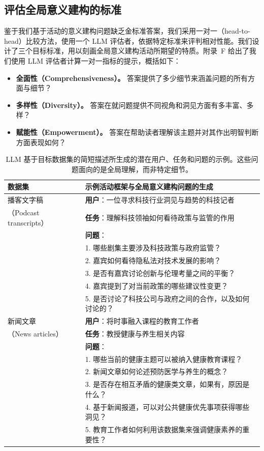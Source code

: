 \documentclass[11pt,UTF8,fontset=fandol]{ctexart}
\begin{document}
\subsection{评估全局意义建构的标准}

鉴于我们基于活动的意义建构问题缺乏金标准答案，我们采用一对一（head-to-head）比较方法，使用一个 LLM 评估者，依据特定标准来评判相对性能。我们设计了三个目标标准，用以刻画全局意义建构活动所期望的特质。附录~F 给出了我们使用 LLM 评估者计算一对一指标的提示，概括如下：

\begin{itemize}[leftmargin=2em]
\item \textbf{全面性（Comprehensiveness）。} 答案提供了多少细节来涵盖问题的所有方面与细节？
\item \textbf{多样性（Diversity）。} 答案在就问题提供不同视角和洞见方面有多丰富、多样？
\item \textbf{赋能性（Empowerment）。} 答案在帮助读者理解该主题并对其作出明智判断方面表现如何？
\end{itemize}

\begin{table}[H]\centering
\caption{LLM 基于目标数据集的简短描述所生成的潜在用户、任务和问题的示例。这些问题面向的是全局理解，而非特定细节。}
\label{tab:1}
\small
\renewcommand{\arraystretch}{1.25}
\begin{tabular}{@{}p{2.2cm}p{12.5cm}@{}}
\toprule
\textbf{数据集} & \textbf{示例活动框架与全局意义建构问题的生成} \\
\midrule
播客文字稿 & \textbf{用户}：一位寻求科技行业洞见与趋势的科技记者 \\
（Podcast transcripts） & \textbf{任务}：理解科技领袖如何看待政策与监管的作用 \\
 & \textbf{问题}： \\
 & 1. 哪些剧集主要涉及科技政策与政府监管？ \\
 & 2. 嘉宾如何看待隐私法对技术发展的影响？ \\
 & 3. 是否有嘉宾讨论创新与伦理考量之间的平衡？ \\
 & 4. 嘉宾提到了对当前政策的哪些建议性变更？ \\
 & 5. 是否讨论了科技公司与政府之间的合作，以及如何讨论的？ \\
\midrule
新闻文章 & \textbf{用户}：将时事融入课程的教育工作者 \\
（News articles） & \textbf{任务}：教授健康与养生相关内容 \\
 & \textbf{问题}： \\
 & 1. 哪些当前的健康主题可以被纳入健康教育课程？ \\
 & 2. 新闻文章如何论述预防医学与养生的概念？ \\
 & 3. 是否存在相互矛盾的健康类文章，如果有，原因是什么？ \\
 & 4. 基于新闻报道，可以对公共健康优先事项获得哪些洞见？ \\
 & 5. 教育工作者如何利用该数据集来强调健康素养的重要性？ \\
\bottomrule
\end{tabular}
\end{table}
\end{document}
